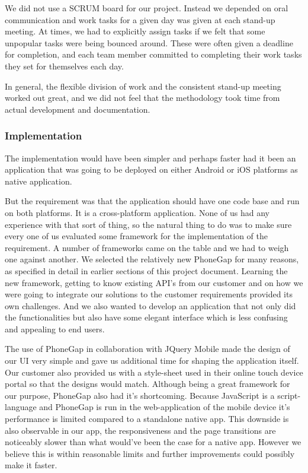 We did not use a SCRUM board for our project. Instead we depended on oral 
communication and work tasks for a given day was given at each stand-up meeting.
At times, we had to explicitly assign tasks if we felt that some
unpopular tasks were being bounced around. These were often given a deadline for
completion, and each team member committed to completing their work tasks they
set for themselves each day.

In general, the flexible division of work and the consistent stand-up meeting
worked out great, and we did not feel that the methodology took time from actual
development and documentation. 

	\subsubsection{Implementation}
The implementation would have been simpler and perhaps faster had it been an
application that was going to be deployed on either Android or iOS platforms as
native application.

But the requirement was that the application should have one code base and run
on both platforms.
It is a cross-platform application.
None of us had any experience with that sort of thing, so the natural thing to
do was to make sure every one of us evaluated some framework for the
implementation of the requirement.
A number of frameworks came on the table and we had to weigh one against another.
We selected the relatively new PhoneGap for many reasons, as specified in detail
in earlier sections of this project document.
Learning the new framework, getting to know existing API's from our customer and
on how we were going to integrate our solutions to the customer requirements
provided its own challenges.
And we also wanted to develop an application that not only did the
functionalities but also have some elegant interface which is less confusing and
appealing to end users.

The use of PhoneGap in collaboration with JQuery Mobile made the design of our
UI very simple and gave us additional time for shaping the application itself.
Our customer also provided us with a style-sheet used in their online touch
device portal so that the designs would match.  Although being a great framework
for our purpose, PhoneGap also had it's shortcoming.  Because JavaScript is a
script-language and PhoneGap is run in the web-application of the mobile device it's performance
is limited compared to a standalone native app.  This downside is also
observable in our app, the responsiveness and the page transitions are noticeably
slower than what would've been the case for a native app.  However we believe
this is within reasonable limits and further improvements could possibly make it
faster.

